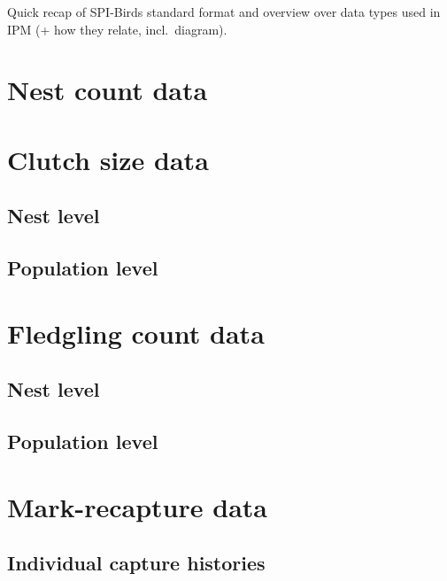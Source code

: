 \documentclass[
]{book}
\begin{document}
Quick recap of SPI-Birds standard format and overview over data types used in IPM (+ how they relate, incl.~diagram).

\hypertarget{nest-count-data}{%
\section{Nest count data}\label{nest-count-data}}

\hypertarget{clutch-size-data}{%
\section{Clutch size data}\label{clutch-size-data}}

\hypertarget{nest-level}{%
\subsection{Nest level}\label{nest-level}}

\hypertarget{population-level}{%
\subsection{Population level}\label{population-level}}

\hypertarget{fledgling-count-data}{%
\section{Fledgling count data}\label{fledgling-count-data}}

\hypertarget{nest-level-1}{%
\subsection{Nest level}\label{nest-level-1}}

\hypertarget{population-level-1}{%
\subsection{Population level}\label{population-level-1}}

\hypertarget{mark-recapture-data}{%
\section{Mark-recapture data}\label{mark-recapture-data}}

\hypertarget{individual-capture-histories}{%
\subsection{Individual capture histories}\label{individual-capture-histories}}
\end{document}
